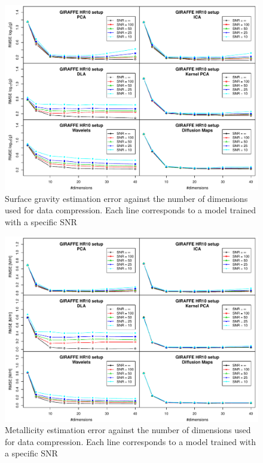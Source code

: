 \documentclass[a4paper,fleqn,usenatbib]{mnras}
\begin{document}
{{{\begin{figure}
\centering\includegraphics[width=\textwidth]{flamesHR10_Logg_log_BestSVM_N-SNR-RMSE_test.pdf}
\caption{Surface gravity estimation error against the number of dimensions
  used for data compression. Each line corresponds to a model trained
  with a specific SNR}
\label{fig:methodsnrLogg}
\end{figure}

\begin{figure}
\centering\includegraphics[width=\textwidth]{flamesHR10_Meta_log_BestSVM_N-SNR-RMSE_test.pdf}
\caption{Metallicity estimation error against the number of dimensions
  used for data compression. Each line corresponds to a model trained
  with a specific SNR}
\label{fig:methodsnrMeta}
\end{figure}

}}}
\end{document}
